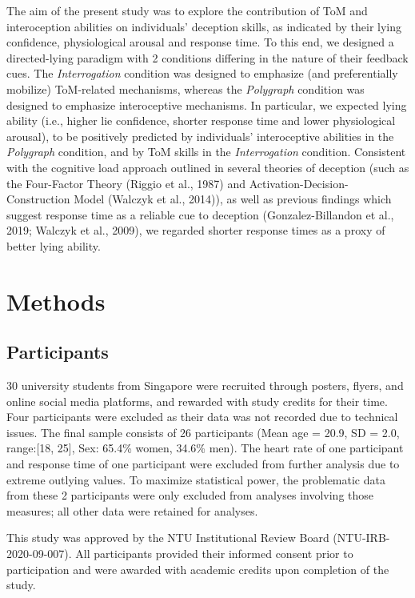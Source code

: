 \documentclass[
  man,mask,floatsintext]{apa6}
\begin{document}
The aim of the present study was to explore the contribution of ToM and interoception abilities on individuals' deception skills, as indicated by their lying confidence, physiological arousal and response time. To this end, we designed a directed-lying paradigm with 2 conditions differing in the nature of their feedback cues. The \emph{Interrogation} condition was designed to emphasize (and preferentially mobilize) ToM-related mechanisms, whereas the \emph{Polygraph} condition was designed to emphasize interoceptive mechanisms. In particular, we expected lying ability (i.e., higher lie confidence, shorter response time and lower physiological arousal), to be positively predicted by individuals' interoceptive abilities in the \emph{Polygraph} condition, and by ToM skills in the \emph{Interrogation} condition. Consistent with the cognitive load approach outlined in several theories of deception (such as the Four-Factor Theory (Riggio et al., 1987) and Activation-Decision-Construction Model (Walczyk et al., 2014)), as well as previous findings which suggest response time as a reliable cue to deception (Gonzalez-Billandon et al., 2019; Walczyk et al., 2009), we regarded shorter response times as a proxy of better lying ability.

\hypertarget{methods}{%
\section{Methods}\label{methods}}

\hypertarget{participants}{%
\subsection{Participants}\label{participants}}

30 university students from Singapore were recruited through posters, flyers, and online social media platforms, and rewarded with study credits for their time.
Four participants were excluded as their data was not recorded due to technical issues. The final sample consists of 26 participants (Mean age = 20.9, SD = 2.0, range:{[}18, 25{]}, Sex: 65.4\% women, 34.6\% men). The heart rate of one participant and response time of one participant were excluded from further analysis due to extreme outlying values. To maximize statistical power, the problematic data from these 2 participants were only excluded from analyses involving those measures; all other data were retained for analyses.

This study was approved by the NTU Institutional Review Board (NTU-IRB-2020-09-007). All participants provided their informed consent prior to participation and were awarded with academic credits upon completion of the study.
\end{document}
